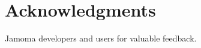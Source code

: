 \documentclass{article}
\newenvironment{packed_item}{
\begin{itemize}
  \setlength{\itemsep}{1pt}
  \setlength{\parskip}{0pt}
  \setlength{\parsep}{0pt}
}{\end{itemize}}
\begin{document}

%
%	
%






\section{Acknowledgments} %

Jamoma developers and users for valuable feedback.

%

%
\end{document}

